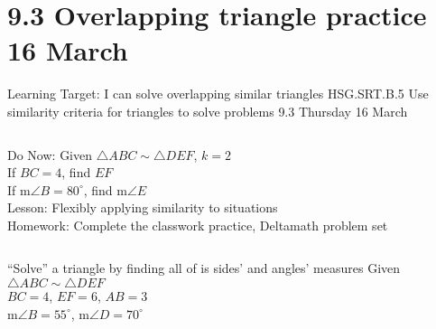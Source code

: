 \section{9.3 Overlapping triangle practice \hfill 16 March \,}
\begin{frame}{Learning Target: I can solve overlapping similar triangles}
  {HSG.SRT.B.5 Use similarity criteria for triangles to solve problems \hfill \alert{9.3 Thursday 16 March}}
  \begin{columns}
    Do Now: Given $\triangle ABC \sim \triangle DEF$, $k=2$ \\
    If $BC=4$, find $EF$ \\
    If m$\angle B = 80^\circ$, find m$\angle E$\\[0.5cm]
    Lesson: Flexibly applying similarity to situations \\[0.5cm]
    Homework: Complete the classwork practice, Deltamath problem set \\[0.5cm]
    \begin{flushright}
    \end{flushright}
  \end{columns}
\end{frame}

\begin{frame}{``Solve'' a triangle by finding all of is sides' and angles' measures}
    Given $\triangle ABC \sim \triangle DEF$ \\[0.2cm]
    $BC=4$, $EF=6$, $AB=3$\\[0.2cm]
    m$\angle B = 55^\circ$, m$\angle D=70^\circ$\\[0.5cm]
    \begin{center}
    \end{center}
\end{frame}

